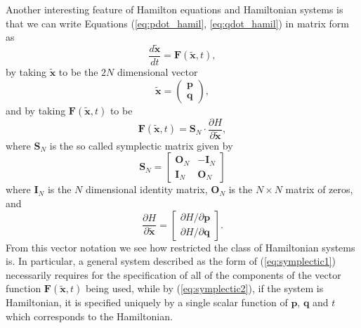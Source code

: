 Another interesting feature of Hamilton equations and Hamiltonian systems is that we can write Equations (\ref{eq:pdot_hamil},   \ref{eq:qdot_hamil}) in matrix form as
\begin{equation}
\frac{d\tilde{\bm{x}}}{dt}=\bm{F}(\tilde{\bm{x}},t),
\label{eq:symplectic1}
\end{equation}
by taking $\tilde{\bm{x}}$ to be the $2N$ dimensional vector
\begin{equation}
\tilde{\bm{x}}=\begin{pmatrix}
\bm{p}\\
\bm{q}
\end{pmatrix},
\end{equation}
and by taking $\bm{F}(\tilde{\bm{x}},t)$ to be 
\begin{equation}
\bm{F}(\tilde{\bm{x}},t)=\bm{S}_N \cdot \frac{\partial H}{\partial \tilde{\bm{x}}},
\label{eq:symplectic2}
\end{equation}
where $\bm{S}_N$ is the so called symplectic matrix given by 
\begin{equation}
\bm{S}_N=
\begin{bmatrix}
\bm{O}_N & -\bm{I}_N \\
\bm{I}_N & \bm{O}_N
\end{bmatrix}
\label{eq:symplectic_matrix}
\end{equation}
where $\bm{I}_N$ is the $N$ dimensional identity matrix, $\bm{O}_N$ is the $N \times N$ matrix of zeros, and
\begin{equation}
\frac{\partial H}{\partial \tilde{\bm{x}}}=\begin{bmatrix}
\partial H / \partial \bm{p} \\
\partial H / \partial \bm{q}
\end{bmatrix}.
\label{eq:sympl_hamil}
\end{equation}
From this vector notation we see how restricted the class of Hamiltonian systems is. In particular, a general system described as the form of (\ref{eq:symplectic1}) necessarily requires for the specification of all of the components of the vector function $\bm{F}(\tilde{\bm{x}},t)$ being used, while by (\ref{eq:symplectic2}), if the system is Hamiltonian, it is specified uniquely by a single scalar function of $\bm{p}$, $\bm{q}$ and $t$ which corresponds to the Hamiltonian.\par

